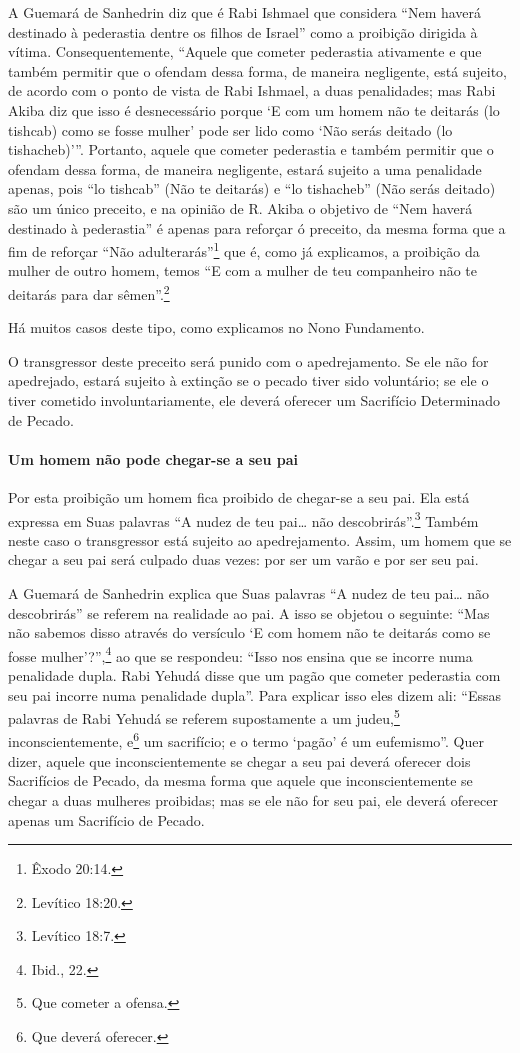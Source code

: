 A Guemará de Sanhedrin diz que é Rabi Ishmael que considera ``Nem haverá
destinado à pederastia dentre os filhos de Israel'' como a proibição
dirigida à vítima. Consequentemente, ``Aquele que cometer pederastia
ativamente e que também permitir que o ofendam dessa forma, de maneira
negligente, está sujeito, de acordo com o ponto de vista de Rabi
Ishmael, a duas penalidades; mas Rabi Akiba diz que isso é
desnecessário porque `E com um homem não te deitarás (lo tishcab) como
se fosse mulher' pode ser lido como `Não serás deitado (lo
tishacheb)'''. Portanto, aquele que cometer pederastia e também permitir que o ofendam dessa forma, de maneira negligente, estará
sujeito a uma penalidade apenas, pois ``lo tishcab'' (Não te deitarás) e
``lo tishacheb'' (Não serás deitado) são um único preceito, e na opinião
de R. Akiba o objetivo de ``Nem haverá destinado à pederastia'' é apenas
para reforçar ó preceito, da mesma forma que a fim de reforçar ``Não
adulterarás''\footnote{Êxodo 20:14.} que é, como já explicamos, a proibição da
mulher de outro homem, temos ``E com a mulher de teu companheiro não te
deitarás para dar sêmen''.\footnote{Levítico 18:20.}

Há muitos casos deste tipo, como explicamos no Nono Fundamento.

O transgressor deste preceito será punido com o apedrejamento. Se ele
não for apedrejado, estará sujeito à extinção se o pecado tiver sido
voluntário; se ele o tiver cometido involuntariamente, ele deverá
oferecer um Sacrifício Determinado de Pecado.

\paragraph{Um homem não pode chegar-se a seu pai}

Por esta proibição um homem fica proibido de chegar-se a seu pai. Ela
está expressa em Suas palavras ``A nudez de teu pai\ldots{} não descobrirás''.\footnote{Levítico 18:7.} Também neste caso o transgressor está sujeito ao
apedrejamento. Assim, um homem que se chegar a seu pai será culpado duas
vezes: por ser um varão e por ser seu pai.

A Guemará de Sanhedrin explica que Suas palavras ``A nudez de teu pai\ldots{}
não descobrirás'' se referem na realidade ao pai. A isso se objetou o
seguinte: ``Mas não sabemos disso através do versículo `E com homem não
te deitarás como se fosse mulher'?'',\footnote{Ibid., 22.} ao que se respondeu:
``Isso nos ensina que se incorre numa penalidade dupla. Rabi Yehudá
disse que um pagão que cometer pederastia com seu pai incorre numa
penalidade dupla''. Para explicar isso eles dizem ali: ``Essas palavras
de Rabi Yehudá se referem supostamente a um judeu,\footnote{Que cometer a ofensa.}
inconscientemente, e\footnote{Que deverá oferecer.} um sacrifício; e o termo
`pagão' é um eufemismo''. Quer dizer, aquele que inconscientemente se
chegar a seu pai deverá oferecer dois Sacrifícios de Pecado, da mesma
forma que aquele que inconscientemente se chegar a duas mulheres
proibidas; mas se ele não for seu pai, ele deverá oferecer apenas um
Sacrifício de Pecado.


